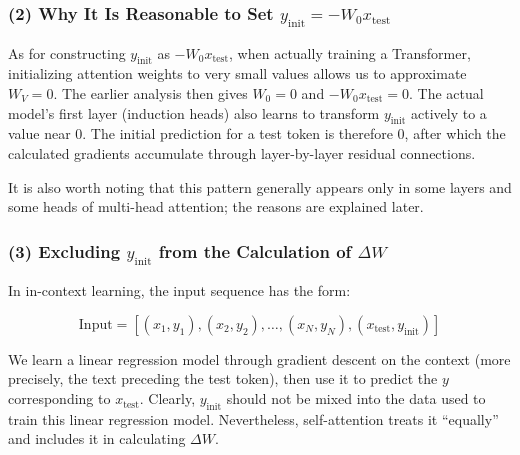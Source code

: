 \hypertarget{why-it-is-reasonable-to-set-y_mathrminit-w_0x_mathrmtest}{%
\subsubsection{\texorpdfstring{(2) Why It Is Reasonable to Set \(y_{\mathrm{init}}=-W_0x_{\mathrm{test}}\)}{(2) Why It Is Reasonable to Set y\_\{\textbackslash mathrm\{init\}\}=-W\_0x\_\{\textbackslash mathrm\{test\}\}}}\label{why-it-is-reasonable-to-set-y_mathrminit-w_0x_mathrmtest}}

As for constructing \(y_{\mathrm{init}}\) as \(-W_0x_{\mathrm{test}}\), when actually training a Transformer, initializing attention weights to very small values allows us to approximate \(W_V=0\). The earlier analysis then gives \(W_0=0\) and \(-W_0x_{\mathrm{test}}=0\). The actual model's first layer (induction heads) also learns to transform \(y_{\mathrm{init}}\) actively to a value near 0. The initial prediction for a test token is therefore 0, after which the calculated gradients accumulate through layer-by-layer residual connections.

It is also worth noting that this pattern generally appears only in some layers and some heads of multi-head attention; the reasons are explained later.

\hypertarget{excluding-y_mathrminit-from-the-calculation-of-delta-w}{%
\subsubsection{\texorpdfstring{(3) Excluding \(y_{\mathrm{init}}\) from the Calculation of \(\Delta W\)}{(3) Excluding y\_\{\textbackslash mathrm\{init\}\} from the Calculation of \textbackslash Delta W}}\label{excluding-y_mathrminit-from-the-calculation-of-delta-w}}

In in-context learning, the input sequence has the form:

\[
\mathrm{Input}=[(x_1,y_1),(x_2,y_2),\ldots,(x_N,y_N),(x_{\mathrm{test}},y_{\mathrm{init}})]
\]

We learn a linear regression model through gradient descent on the context (more precisely, the text preceding the test token), then use it to predict the \(y\) corresponding to \(x_{\mathrm{test}}\). Clearly, \(y_{\mathrm{init}}\) should not be mixed into the data used to train this linear regression model. Nevertheless, self-attention treats it ``equally'' and includes it in calculating \(\Delta W\).

